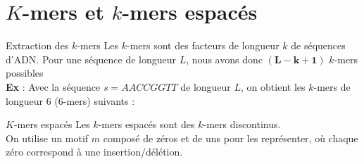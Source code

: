 \documentclass[11pt]{beamer}
\begin{document}
\section{$K$-mers et $k$-mers espacés}
\begin{frame}[fragile]{Extraction des $k$-mers}
  Les $k$-mers sont des facteurs de longueur $k$ de séquences d'ADN. Pour une séquence de longueur $L$, nous avons donc $\mathbf{(L - k + 1)}$ $k$-mers possibles\medskip\\\pause
  \textbf{Ex} : Avec la séquence $s = AACCGGTT$ de longueur $L$, on obtient les $k$-mers de longueur $6$ ($6$-mers) suivants :\\\pause
  \begin{center}\end{center}
\end{frame}
\begin{frame}[fragile]{$K$-mers espacés}
  Les $k$-mers espacés sont des $k$-mers discontinus.\pause\medskip\\
  On utilise un motif $m$ composé de zéros et de uns pour les représenter, où chaque zéro correspond à une insertion/délétion.
\end{frame}
\end{document}
